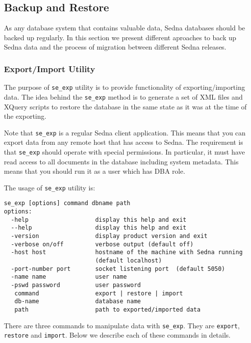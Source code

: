 \documentclass[a4paper,12pt]{article}
\begin{document}
\subsection{Backup and Restore}

As any database system that contains valuable data, Sedna databases should be backed up regularly.
In this section we present different aproaches to back up Sedna data and the process of 
migration between different Sedna releases.


\subsubsection{Export/Import Utility}

The purpose of \verb!se_exp! utility is to provide functionality of exporting/importing data. The 
idea behind the \verb!se_exp! method is to generate a set of XML files and XQuery 
scripts to restore the database in the same state as it was at the time of the exporting. 

Note that \verb!se_exp! is a regular Sedna client application. This means that you can export data from
any remote host that has access to Sedna. The requirement is that \verb!se_exp! should operate with 
special permissions. In particular, it must have read access to all documents in the database including 
system metadata. This means that you should run it as a user which has DBA role.

The usage of \verb!se_exp! utility is:

\begin{verbatim}
se_exp [options] command dbname path
options:
  -help                   display this help and exit
  --help                  display this help and exit
  -version                display product version and exit
  -verbose on/off         verbose output (default off)
  -host host              hostname of the machine with Sedna running
                          (default localhost)
  -port-number port       socket listening port  (default 5050)
  -name name              user name
  -pswd password          user password
   command                export | restore | import
   db-name                database name
   path                   path to exported/imported data
\end{verbatim}


There are three commands to manipulate data with \verb!se_exp!. They are \verb!export!,
\verb!restore! and \verb!import!. Below we describe each of these commands in details.
\end{document}

